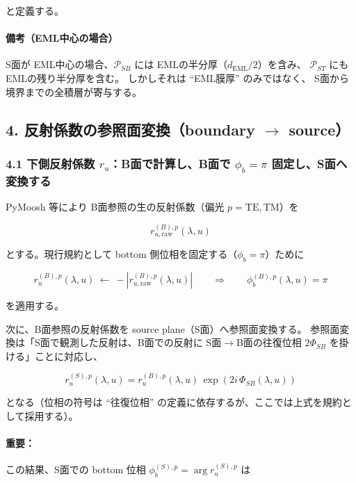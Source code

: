 と定義する。

\paragraph{備考（EML中心の場合）}
S面が EML中心の場合、\(\mathcal{P}_{SB}\) には
EMLの半分厚（\(d_{\mathrm{EML}}/2\)）を含み、
\(\mathcal{P}_{ST}\) にも EMLの残り半分厚を含む。
しかしそれは ``EML膜厚'' のみではなく、
S面から境界までの全積層が寄与する。

\subsection*{4. 反射係数の参照面変換（boundary \(\rightarrow\) source）}

\subsubsection*{4.1 下側反射係数 \(r_u\)：B面で計算し、B面で \(\phi_b=\pi\) 固定し、S面へ変換する}

PyMoosh 等により B面参照の生の反射係数（偏光 \(p=\mathrm{TE,TM}\)）を

\begin{equation}
r_{u,\mathrm{raw}}^{(B),p}(\lambda,u)
\end{equation}

とする。現行規約として bottom 側位相を固定する（\(\phi_b=\pi\)）ために

\begin{equation}
\boxed{
r_u^{(B),p}(\lambda,u)\ \leftarrow\ -\left|r_{u,\mathrm{raw}}^{(B),p}(\lambda,u)\right|
}
\qquad\Longrightarrow\qquad
\boxed{\phi_b^{(B),p}(\lambda,u)=\pi}
\end{equation}

を適用する。

次に、B面参照の反射係数を source plane（S面）へ参照面変換する。
参照面変換は「S面で観測した反射は、B面での反射に
S面\(\rightarrow\)B面の往復位相 \(2\Phi_{SB}\) を掛ける」ことに対応し、

\begin{equation}
\boxed{
r_u^{(S),p}(\lambda,u)
=
r_u^{(B),p}(\lambda,u)\,
\exp\!\left(2i\,\Phi_{SB}(\lambda,u)\right)
}
\end{equation}

となる（位相の符号は ``往復位相'' の定義に依存するが、ここでは上式を規約として採用する）。

\paragraph{重要：}
この結果、S面での bottom 位相 \(\phi_b^{(S),p}=\arg r_u^{(S),p}\) は

